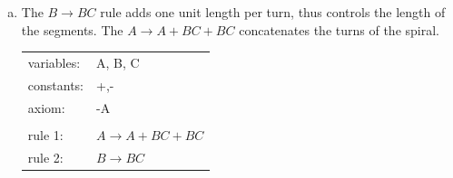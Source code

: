 \documentclass[10pt,a4paper,boxed]{hmcpset}
\begin{document}
\begin{solution}
	\begin{enumerate}[a)]
		\item 
			The $B \rightarrow B C$ rule adds one unit length per turn, thus controls the length of the segments. The $A \rightarrow A +B C +B C$ concatenates the turns of the spiral.
				\begin{tabular}[t]{ll}
					 variables: & A, B, C\\ 
					 constants: & +,- \\
					 axiom: & -A \\
							& \\
					 rule 1: & $A \rightarrow A +B C +B C$ \\
					 rule 2: & $B \rightarrow B C$ \\
				\end{tabular}


\end{enumerate}
\end{solution}
\end{document}
